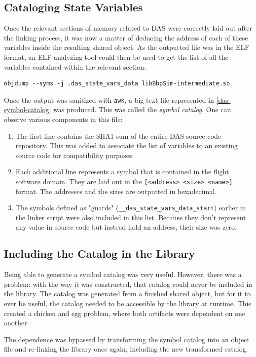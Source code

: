 {\subsection*{Cataloging State Variables}
Once the relevant sections of memory related to DAS were correctly laid out after the linking process, it was now a matter of deducing the address of each of these variables inside the resulting shared object. As the outputted file was in the ELF format, an ELF analyzing tool could then be used to get the list of all the variables contained within the relevant section:
\begin{verbatim}
objdump --syms -j .das_state_vars_data libBbpSim-intermediate.so
\end{verbatim}
Once the output was sanitized with \texttt{awk}, a big text file represented in  \autoref{das-symbol-catalog} was produced. This was called the \textit{symbol catalog}. One can observe various components in this file:
\begin{enumerate}
	\item The first line contains the SHA1 sum of the entire DAS source code repository. This was added to associate the list of variables to an existing source code for compatibility purposes.
	\item Each additional line represents a symbol that is contained in the flight software domain. They are laid out in the \verb|[<address> <size> <name>]| format. The addresses and the sizes are outputted in hexadecimal.
	\item The symbols defined as "guards" (\texttt{__das_state_vars_data_start}) earlier in the linker script were also included in this list. Because they don't represent any value in source code but instead hold an address, their size was zero.
\end{enumerate}

\subsection*{Including the Catalog in the Library}
Being able to generate a symbol catalog was very useful. However, there was a problem: with the way it was constructed, that catalog could never be included in the library. The catalog was generated from a finished shared object, but for it to ever be useful, the catalog needed to be accessible by the library at runtime. This created a chicken and egg problem, where both artifacts were dependent on one another.

The dependence was bypassed by transforming the symbol catalog into an object file and re-linking the library once again, including the new transformed catalog. 

}
